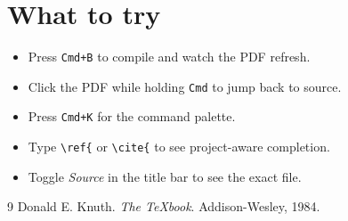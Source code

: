 \documentclass[11pt,a4paper]{article}
\begin{document}
\section{What to try}

\begin{itemize}
  \item Press \texttt{Cmd+B} to compile and watch the PDF refresh.
  \item Click the PDF while holding \texttt{Cmd} to jump back to source.
  \item Press \texttt{Cmd+K} for the command palette.
  \item Type \verb|\ref{| or \verb|\cite{| to see project-aware completion.
  \item Toggle \emph{Source} in the title bar to see the exact file.
\end{itemize}


\begin{thebibliography}{9}
  Donald E. Knuth.
  \newblock \emph{The \TeX{}book}.
  \newblock Addison-Wesley, 1984.
\end{thebibliography}
\end{document}
